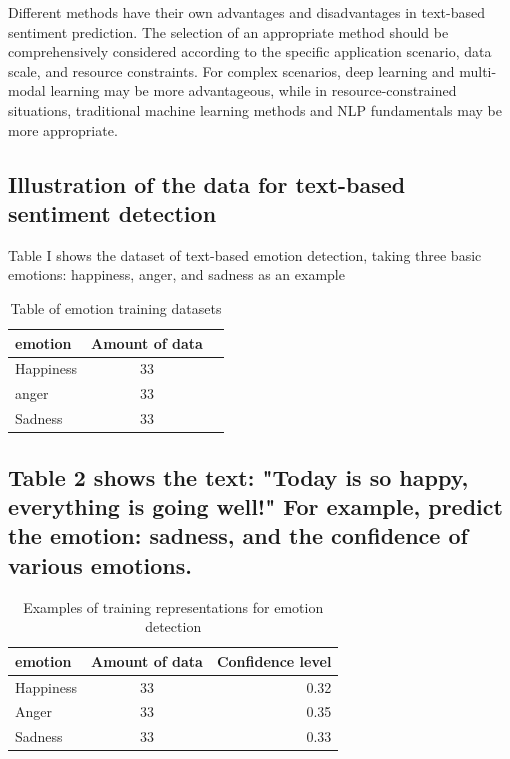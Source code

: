 \documentclass[journal]{IEEEtran}
\begin{document}
Different methods have their own advantages and disadvantages in text-based sentiment prediction. The selection of an appropriate method should be comprehensively considered according to the specific application scenario, data scale, and resource constraints. For complex scenarios, deep learning and multi-modal learning may be more advantageous, while in resource-constrained situations, traditional machine learning methods and NLP fundamentals may be more appropriate.


\subsection{Illustration of the data for text-based sentiment detection}
Table I shows the dataset of text-based emotion detection, taking three basic emotions: happiness, anger, and sadness as an example 


\begin{table}[htb]
\centering
\caption{Table of emotion training datasets}
\label{tab:example}
\begin{tabular}{lcr}
\toprule
\textbf{emotion} & \textbf{Amount of data}  \\
\midrule
Happiness        & 33                            \\
anger            & 33                             \\
Sadness          & 33                             \\
\bottomrule
\end{tabular}
\end{table}

\subsection{Table 2 shows the text: "Today is so happy, everything is going well!" For example, predict the emotion: sadness, and the confidence of various emotions. }


\begin{table}[htb]
\centering
\caption{Examples of training representations for emotion detection}
\label{tab:example}
\begin{tabular}{lcr}
\toprule
\textbf{emotion} & \textbf{Amount of data} & \textbf{Confidence level} \\
\midrule
Happiness         & 33                & 0.32                \\
Anger             & 33                & 0.35               \\
Sadness           & 33                & 0.33                \\
\bottomrule
\end{tabular}
\end{table}
\end{document}
